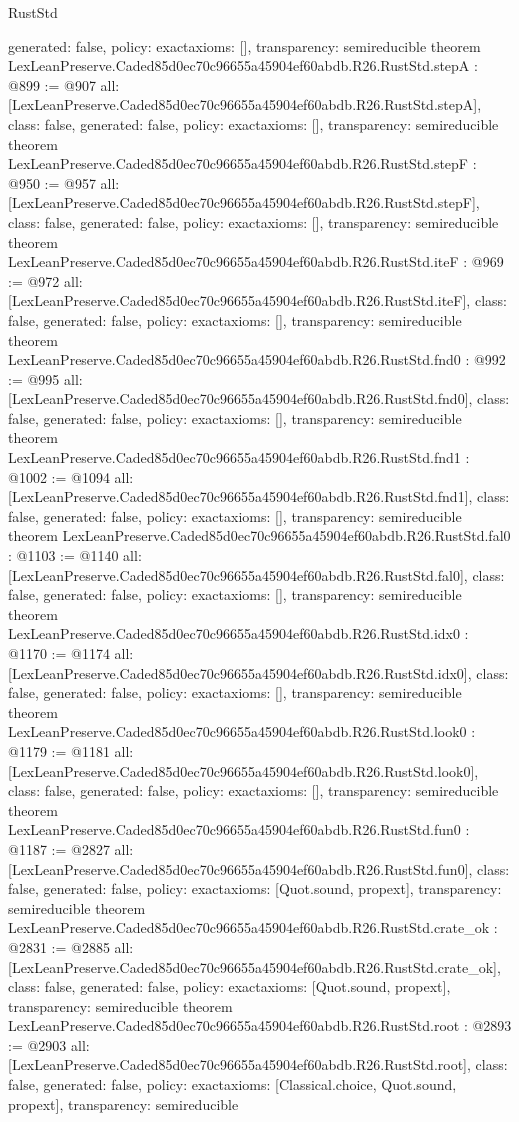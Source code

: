 \begin{lexlean}{RustStd}
\begin{coremodule}
{  generated: false,
  policy: exact{axioms: []},
  transparency: semireducible
}
theorem LexLeanPreserve.Caded85d0ec70c96655a45904ef60abdb.R26.RustStd.stepA : @899 := @907 {
  all: [LexLeanPreserve.Caded85d0ec70c96655a45904ef60abdb.R26.RustStd.stepA],
  class: false,
  generated: false,
  policy: exact{axioms: []},
  transparency: semireducible
}
theorem LexLeanPreserve.Caded85d0ec70c96655a45904ef60abdb.R26.RustStd.stepF : @950 := @957 {
  all: [LexLeanPreserve.Caded85d0ec70c96655a45904ef60abdb.R26.RustStd.stepF],
  class: false,
  generated: false,
  policy: exact{axioms: []},
  transparency: semireducible
}
theorem LexLeanPreserve.Caded85d0ec70c96655a45904ef60abdb.R26.RustStd.iteF : @969 := @972 {
  all: [LexLeanPreserve.Caded85d0ec70c96655a45904ef60abdb.R26.RustStd.iteF],
  class: false,
  generated: false,
  policy: exact{axioms: []},
  transparency: semireducible
}
theorem LexLeanPreserve.Caded85d0ec70c96655a45904ef60abdb.R26.RustStd.fnd0 : @992 := @995 {
  all: [LexLeanPreserve.Caded85d0ec70c96655a45904ef60abdb.R26.RustStd.fnd0],
  class: false,
  generated: false,
  policy: exact{axioms: []},
  transparency: semireducible
}
theorem LexLeanPreserve.Caded85d0ec70c96655a45904ef60abdb.R26.RustStd.fnd1 : @1002 := @1094 {
  all: [LexLeanPreserve.Caded85d0ec70c96655a45904ef60abdb.R26.RustStd.fnd1],
  class: false,
  generated: false,
  policy: exact{axioms: []},
  transparency: semireducible
}
theorem LexLeanPreserve.Caded85d0ec70c96655a45904ef60abdb.R26.RustStd.fal0 : @1103 := @1140 {
  all: [LexLeanPreserve.Caded85d0ec70c96655a45904ef60abdb.R26.RustStd.fal0],
  class: false,
  generated: false,
  policy: exact{axioms: []},
  transparency: semireducible
}
theorem LexLeanPreserve.Caded85d0ec70c96655a45904ef60abdb.R26.RustStd.idx0 : @1170 := @1174 {
  all: [LexLeanPreserve.Caded85d0ec70c96655a45904ef60abdb.R26.RustStd.idx0],
  class: false,
  generated: false,
  policy: exact{axioms: []},
  transparency: semireducible
}
theorem LexLeanPreserve.Caded85d0ec70c96655a45904ef60abdb.R26.RustStd.look0 : @1179 := @1181 {
  all: [LexLeanPreserve.Caded85d0ec70c96655a45904ef60abdb.R26.RustStd.look0],
  class: false,
  generated: false,
  policy: exact{axioms: []},
  transparency: semireducible
}
theorem LexLeanPreserve.Caded85d0ec70c96655a45904ef60abdb.R26.RustStd.fun0 : @1187 := @2827 {
  all: [LexLeanPreserve.Caded85d0ec70c96655a45904ef60abdb.R26.RustStd.fun0],
  class: false,
  generated: false,
  policy: exact{axioms: [Quot.sound, propext]},
  transparency: semireducible
}
theorem LexLeanPreserve.Caded85d0ec70c96655a45904ef60abdb.R26.RustStd.crate_ok : @2831 := @2885 {
  all: [LexLeanPreserve.Caded85d0ec70c96655a45904ef60abdb.R26.RustStd.crate_ok],
  class: false,
  generated: false,
  policy: exact{axioms: [Quot.sound, propext]},
  transparency: semireducible
}
theorem LexLeanPreserve.Caded85d0ec70c96655a45904ef60abdb.R26.RustStd.root : @2893 := @2903 {
  all: [LexLeanPreserve.Caded85d0ec70c96655a45904ef60abdb.R26.RustStd.root],
  class: false,
  generated: false,
  policy: exact{axioms: [Classical.choice, Quot.sound, propext]},
  transparency: semireducible
}


\end{coremodule}
\end{lexlean}
